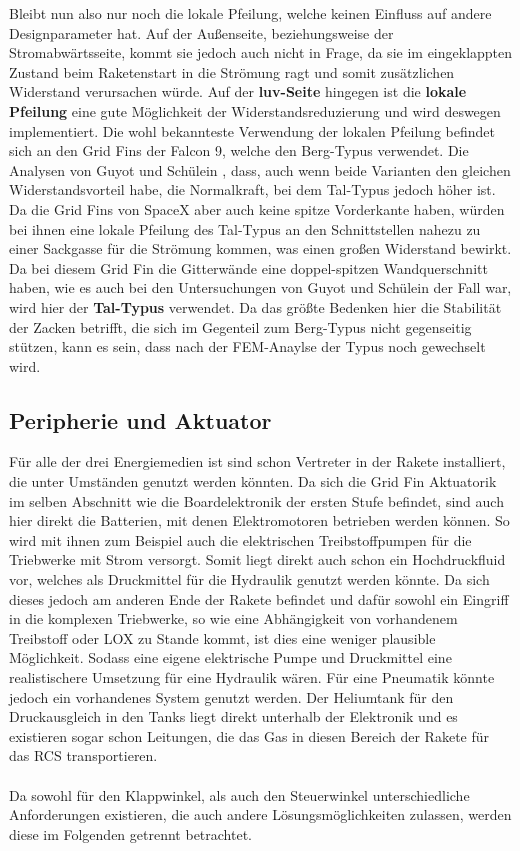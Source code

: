 Bleibt nun also nur noch die lokale Pfeilung, welche keinen Einfluss auf andere Designparameter hat. Auf der Außenseite, beziehungsweise der Stromabwärtsseite, kommt sie jedoch auch nicht in Frage, da sie im eingeklappten Zustand beim Raketenstart in die Strömung ragt und somit zusätzlichen Widerstand verursachen würde. Auf der \textbf{luv-Seite} hingegen ist die \textbf{lokale Pfeilung} eine gute Möglichkeit der Widerstandsreduzierung und wird deswegen implementiert. Die wohl bekannteste Verwendung der lokalen Pfeilung befindet sich an den Grid Fins der Falcon 9, welche den Berg-Typus verwendet. Die Analysen von Guyot und Schülein \cite{PeakValley}, dass, auch wenn beide Varianten den gleichen Widerstandsvorteil habe, die Normalkraft, bei dem Tal-Typus jedoch höher ist. Da die Grid Fins von SpaceX aber auch keine spitze Vorderkante haben, würden bei ihnen eine lokale Pfeilung des Tal-Typus an den Schnittstellen nahezu zu einer Sackgasse für die Strömung kommen, was einen großen Widerstand bewirkt. Da bei diesem Grid Fin die Gitterwände eine doppel-spitzen Wandquerschnitt haben, wie es auch bei den Untersuchungen von Guyot und Schülein der Fall war, wird hier der \textbf{Tal-Typus} verwendet. Da das größte Bedenken hier die Stabilität der Zacken betrifft, die sich im Gegenteil zum Berg-Typus nicht gegenseitig stützen, kann es sein, dass nach der FEM-Anaylse der Typus noch gewechselt wird.
\subsection{Peripherie und Aktuator}
Für alle der drei Energiemedien ist sind schon Vertreter in der Rakete installiert, die unter Umständen genutzt werden könnten. Da sich die Grid Fin Aktuatorik im selben Abschnitt wie die Boardelektronik der ersten Stufe befindet, sind auch hier direkt die Batterien, mit denen Elektromotoren betrieben werden können. So wird mit ihnen zum Beispiel auch die elektrischen Treibstoffpumpen für die Triebwerke mit Strom versorgt. Somit liegt direkt auch schon ein Hochdruckfluid vor, welches als Druckmittel für die Hydraulik genutzt werden könnte. Da sich dieses jedoch am anderen Ende der Rakete befindet und dafür sowohl ein Eingriff in die komplexen Triebwerke, so wie eine Abhängigkeit von vorhandenem Treibstoff oder LOX zu Stande kommt, ist dies eine weniger plausible Möglichkeit. Sodass eine eigene elektrische Pumpe und Druckmittel eine realistischere Umsetzung für eine Hydraulik wären. Für eine Pneumatik könnte jedoch ein vorhandenes System genutzt werden. Der Heliumtank für den Druckausgleich in den Tanks liegt direkt unterhalb der Elektronik und es existieren sogar schon Leitungen, die das Gas in diesen Bereich der Rakete für das RCS transportieren.
\\~\\
Da sowohl für den Klappwinkel, als auch den Steuerwinkel unterschiedliche Anforderungen existieren, die auch andere Lösungsmöglichkeiten zulassen, werden diese im Folgenden getrennt betrachtet.
